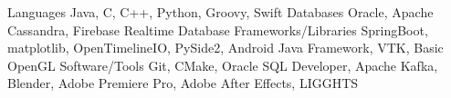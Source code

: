 \begin{cvskills}
  \cvskill
    {Languages}
    {Java, C, C++, Python, Groovy, Swift}
  \cvskill
	{Databases}
	{Oracle, Apache Cassandra, Firebase Realtime Database}
  \cvskill
	{Frameworks/Libraries}
	{SpringBoot, matplotlib, OpenTimelineIO, PySide2, Android Java Framework, VTK, Basic OpenGL}
  \cvskill
	{Software/Tools}
	{Git, CMake, Oracle SQL Developer, Apache Kafka, Blender, Adobe Premiere Pro, Adobe After Effects, LIGGHTS}

\end{cvskills}

